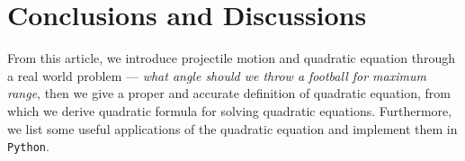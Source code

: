 \section{Conclusions and Discussions}\label{S:conclusions}
From this article, we introduce projectile motion and quadratic equation through a real world problem --- \emph{what angle should we throw a football for maximum range}, then we give a proper and accurate definition of quadratic equation, from which we derive quadratic formula for solving quadratic equations. Furthermore, we list some useful applications of the quadratic equation and implement them in \texttt{Python}.
